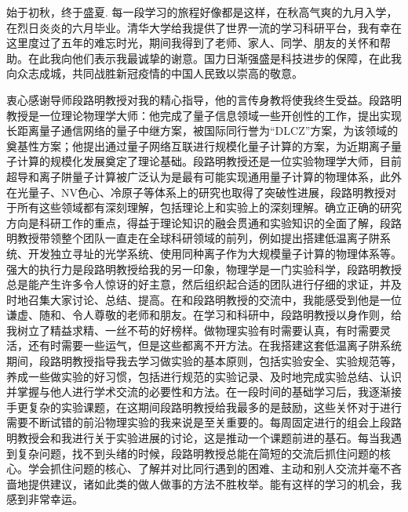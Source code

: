 
\begin{acknowledgements}
  始于初秋，终于盛夏. 每一段学习的旅程好像都是这样，在秋高气爽的九月入学，在烈日炎炎的六月毕业。清华大学给我提供了世界一流的学习科研平台，我有幸在这里度过了五年的难忘时光，期间我得到了老师、家人、同学、朋友的关怀和帮助。在此我向他们表示我最诚挚的谢意。国力日渐强盛是科技进步的保障，在此我向众志成城，共同战胜新冠疫情的中国人民致以崇高的敬意。

  衷心感谢导师段路明教授对我的精心指导，他的言传身教将使我终生受益。段路明教授是一位理论物理学大师：他完成了量子信息领域一些开创性的工作，提出实现长距离量子通信网络的量子中继方案，被国际同行誉为“DLCZ”方案，为该领域的奠基性方案；他提出通过量子网络互联进行规模化量子计算的方案，为近期离子量子计算的规模化发展奠定了理论基础。段路明教授还是一位实验物理学大师，目前超导和离子阱量子计算被广泛认为是最有可能实现通用量子计算的物理体系，此外在光量子、NV色心、冷原子等体系上的研究也取得了突破性进展，段路明教授对于所有这些领域都有深刻理解，包括理论上和实验上的深刻理解。确立正确的研究方向是科研工作的重点，得益于理论知识的融会贯通和实验知识的全面了解，段路明教授带领整个团队一直走在全球科研领域的前列，例如提出搭建低温离子阱系统、开发独立寻址的光学系统、使用同种离子作为大规模量子计算的物理体系等。强大的执行力是段路明教授给我的另一印象，物理学是一门实验科学，段路明教授总是能产生许多令人惊讶的好主意，然后组织起合适的团队进行仔细的求证，并及时地召集大家讨论、总结、提高。在和段路明教授的交流中，我能感受到他是一位谦虚、随和、令人尊敬的老师和朋友。在学习和科研中，段路明教授以身作则，给我树立了精益求精、一丝不苟的好榜样。做物理实验有时需要认真，有时需要灵活，还有时需要一些运气，但是这些都离不开方法。在我搭建这套低温离子阱系统期间，段路明教授指导我去学习做实验的基本原则，包括实验安全、实验规范等，养成一些做实验的好习惯，包括进行规范的实验记录、及时地完成实验总结、认识并掌握与他人进行学术交流的必要性和方法。在一段时间的基础学习后，我逐渐接手更复杂的实验课题，在这期间段路明教授给我最多的是鼓励，这些关怀对于进行需要不断试错的前沿物理实验的我来说是至关重要的。每周固定进行的组会上段路明教授会和我进行关于实验进展的讨论，这是推动一个课题前进的基石。每当我遇到复杂问题，找不到头绪的时候，段路明教授总能在简短的交流后抓住问题的核心。学会抓住问题的核心、了解并对比同行遇到的困难、主动和别人交流并毫不吝啬地提供建议，诸如此类的做人做事的方法不胜枚举。能有这样的学习的机会，我感到非常幸运。


\end{acknowledgements}

